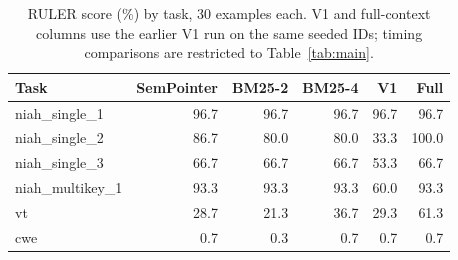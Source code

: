 \begin{table}[t]
\centering
\scriptsize
\setlength{\tabcolsep}{3pt}
\caption{RULER score (\%) by task, 30 examples each. V1 and full-context columns use the earlier V1 run on the same seeded IDs; timing comparisons are restricted to Table~\ref{tab:main}.}
\label{tab:ruler}
\begin{tabular}{lrrrrr}
\toprule
Task & SemPointer & BM25-2 & BM25-4 & V1 & Full \\
\midrule
niah\_single\_1 & 96.7 & 96.7 & 96.7 & 96.7 & 96.7 \\
niah\_single\_2 & 86.7 & 80.0 & 80.0 & 33.3 & 100.0 \\
niah\_single\_3 & 66.7 & 66.7 & 66.7 & 53.3 & 66.7 \\
niah\_multikey\_1 & 93.3 & 93.3 & 93.3 & 60.0 & 93.3 \\
vt & 28.7 & 21.3 & 36.7 & 29.3 & 61.3 \\
cwe & 0.7 & 0.3 & 0.7 & 0.7 & 0.7 \\
\bottomrule
\end{tabular}
\end{table}
